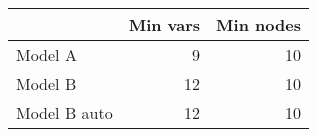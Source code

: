 
\begin{tabular}{l|r|r}
\hline
  & Min vars & Min nodes\\
\hline
Model A & 9 & 10\\
\hline
Model B & 12 & 10\\
\hline
Model B auto & 12 & 10\\
\hline
\end{tabular}